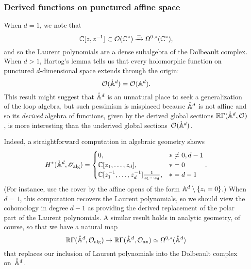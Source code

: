 
\subsubsection{Derived functions on punctured affine space}

When $d=1$, we note that
\[
\CC[z,z^{-1}] \subset \cO(\CC^*) \xto{\simeq} \Omega^{0,*}(\CC^*),
\]
and so the Laurent polynomials are a dense subalgebra of the Dolbeault complex.
When $d >1$, Hartog's lemma tells us that every holomorphic function on punctured $d$-dimensional space extends through the origin:
\[
\cO(\pAA^d) = \cO(\AA^d).
\]
This result might suggest that $\pAA^d$ is an unnatural place to seek a generalization of the loop algebra,
but such pessimism is misplaced because $\pAA^d$ is not affine 
and so its {\em derived} algebra of functions, 
given by the derived global sections $\RR \Gamma(\pAA^d, \cO)$, 
is more interesting than the underived global sections~$\cO(\pAA^d)$.

Indeed, a straightforward computation in algebraic geometry shows
\[
H^*(\pAA^{d}, \sO_{\rm alg}) = 
\begin{cases} 
0, & * \neq 0, d-1 \\ 
\CC[z_1,\ldots,z_d], & * = 0 \\ \CC[z_1^{-1},\ldots,z_d^{-1}] \frac{1}{z_1 \cdots z_d}, & * = d-1 
\end{cases}.
\]
(For instance, use the cover by the affine opens of the form $\AA^d \setminus \{z_i =0\}$.)
When $d=1$, this computation recovers the Laurent polynomials,
so we should view the cohomology in degree $d-1$ as providing the derived replacement of the polar part of the Laurent polynomials.
A similar result holds in analytic geometry, of course,
so that we have a natural map
\[
\RR \Gamma(\pAA^d, \cO_{\rm alg}) \to \RR \Gamma(\pAA^d, \cO_{\rm an}) \simeq \Omega^{0,*}(\pAA^d)
\]
that replaces our inclusion of Laurent polynomials into the Dolbeault complex on~$\pAA^d$.

